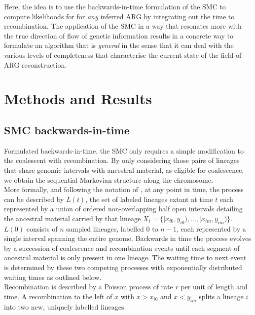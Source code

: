 \documentclass{article}
\begin{document}

Here, the idea is to use the backwards-in-time formulation of the SMC to 
compute likelihoods for for \textit{any} inferred ARG 
by integrating out the time to recombination.
The application of the SMC in a way that resonates more 
with the true direction of flow of genetic information 
results in a concrete way to formulate an algorithm 
that is \textit{general} in the sense that it can deal with the various levels of 
completeness that characterise the current state of the field of ARG reconstruction.


\section{Methods and Results}
\subsection{SMC backwards-in-time}\label{par:description}

Formulated backwards-in-time, the SMC \citep{mcvean_approximating_2005} only requires a 
simple modification to the 
coalescent with recombination. By only considering those pairs of 
lineages that share 
genomic intervals with ancestral material, as eligible for coalescence, we obtain the 
sequential Markovian structure along the chromosome.\\

More formally, and following the notation of \citet{mcvean_approximating_2005}, at any 
point in time, the process can be described by $L(t)$, the set of labeled lineages 
extant at time $t$ each represented by a union of ordered non-overlapping half open 
intervals detailing the ancestral material 
carried by that lineage $X_i = \{[x_{i0}, y_{i0}), \dotsc, [x_{im}, y_{im})\}$.
$L(0)$ consists of $n$ sampled lineages, labelled $0$ to $n-1$, each represented by a 
single interval spanning the entire genome.
Backwards in time the process evolves by a succession of coalescence and recombination 
events until each segment of ancestral material is only present in one lineage. 
The waiting time to next event is determined by these two competing processes 
with exponentially distributed waiting times as outlined below.\\

Recombination is described by a Poisson process of rate $r$ per unit of length and time. 
A recombination to the 
left of $x$ with $x>x_{i0}$ and $x<y_{im}$ splits a lineage $i$ into two new, uniquely 
labelled lineages.\\
\end{document}
